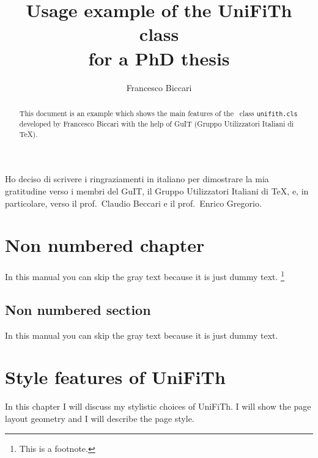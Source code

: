 \documentclass[a4paper,binding=0.6cm]{unifith}
\title{Usage example of the UniFiTh class\\ for a PhD thesis}
\author{Francesco Biccari}
\begin{document}
\frontmatter

\maketitle

\dedication{Dedicated to\\ Donald Knuth}

\begin{abstract}
This document is an example which shows the main features of
the \LaTeXe\ class \texttt{unifith.cls} developed by Francesco Biccari
with the help of GuIT (Gruppo Utilizzatori Italiani di \TeX).
\end{abstract}

\begin{acknowledgments}[Ringraziamenti]
Ho deciso di scrivere i ringraziamenti in italiano
per dimostrare la mia gratitudine verso i membri
del GuIT, il Gruppo Utilizzatori Italiani di \TeX, e, in particolare,
verso il prof.\ Claudio Beccari e il prof.\ Enrico Gregorio.
\end{acknowledgments}

\tableofcontents

\chapter{Non numbered chapter}

In this manual you can skip the gray text because it is just dummy text.%
\footnote{This is a footnote.}

\textcolor{gray}{\lipsum[1-22]}


\section*{Non numbered section}

In this manual you can skip the gray text because it is just dummy text.

\textcolor{gray}{\lipsum[1-22]}




\mainmatter

\chapter{Style features of \textsf{UniFiTh}}

In this chapter I will discuss my stylistic choices of \textsf{UniFiTh}.
I will show the page layout geometry and I will describe the page style.
\end{document}
